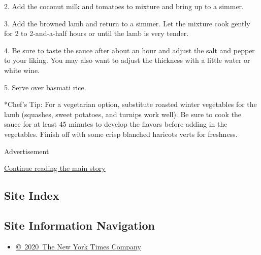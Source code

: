 2. Add the coconut milk and tomatoes to mixture and bring up to a
simmer.

3. Add the browned lamb and return to a simmer. Let the mixture cook
gently for 2 to 2-and-a-half hours or until the lamb is very tender.

4. Be sure to taste the sauce after about an hour and adjust the salt
and pepper to your liking. You may also want to adjust the thickness
with a little water or white wine.

5. Serve over basmati rice.

*Chef's Tip: For a vegetarian option, substitute roasted winter
vegetables for the lamb (squashes, sweet potatoes, and turnips work
well). Be sure to cook the sauce for at least 45 minutes to develop the
flavors before adding in the vegetables. Finish off with some crisp
blanched haricots verts for freshness.

Advertisement

\protect\hyperlink{after-bottom}{Continue reading the main story}

\hypertarget{site-index}{%
\subsection{Site Index}\label{site-index}}

\hypertarget{site-information-navigation}{%
\subsection{Site Information
Navigation}\label{site-information-navigation}}

\begin{itemize}
\tightlist
\item
  \href{https://help.nytimes3xbfgragh.onion/hc/en-us/articles/115014792127-Copyright-notice}{©~2020~The
  New York Times Company}
\end{itemize}

